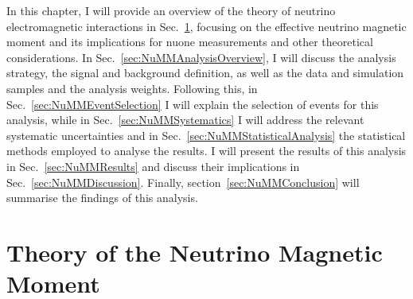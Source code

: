 



In this chapter, I will provide an overview of the theory of neutrino electromagnetic interactions in Sec.~\ref{sec:NuMMTheory}, focusing on the effective neutrino magnetic moment and its implications for \gls{nuone} measurements and other theoretical considerations. In Sec.~\ref{sec:NuMMAnalysisOverview}, I will discuss the analysis strategy, the signal and background definition, as well as the data and simulation samples and the analysis weights. Following this, in Sec.~\ref{sec:NuMMEventSelection} I will explain the selection of events for this analysis, while in Sec.~\ref{sec:NuMMSystematics} I will address the relevant systematic uncertainties and in Sec.~\ref{sec:NuMMStatisticalAnalysis} the statistical methods employed to analyse the results. I will present the results of this analysis in Sec.~\ref{sec:NuMMResults} and discuss their implications in Sec.~\ref{sec:NuMMDiscussion}. Finally, section~\ref{sec:NuMMConclusion} will summarise the findings of this analysis.

\section{Theory of the Neutrino Magnetic Moment}\label{sec:NuMMTheory}

